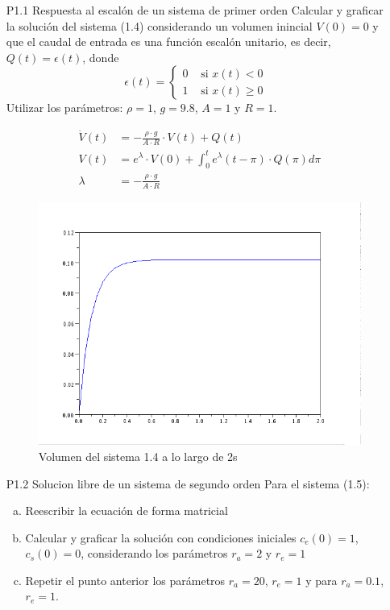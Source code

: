 \documentclass{article}
\begin{document}
\begin{itemize}

  \item[P1.1] Respuesta al escalón de un sistema de primer orden
Calcular y graficar la solución del sistema (1.4) considerando un volumen inincial $ V(0)=0 $ y que el caudal de entrada es una función escalón unitario, es decir, $Q(t)=\epsilon(t)$, donde 
\begin{equation}
\epsilon(t) = \left\{ \begin{array}{rl}
  0 &\mbox{ si $x(t) < 0$} \\
  1 &\mbox{ si $x(t) \geq 0$ }
       \end{array} \right .
 \label{P1.1a} \tag{P1.1a}
\end{equation}
Utilizar los parámetros: $\rho = 1$, $g=9.8$, $A= 1$ y $R = 1$.

\begin{align*}
  \dot{V}(t) &= -\frac{\rho \cdot g}{A \cdot R} \cdot V(t) + Q(t) \\
  V(t) &= e^{\lambda} \cdot V(0) + \int_0^t e^{\lambda} (t - \pi) \cdot Q(\pi) d\pi \\
  \lambda &= -\frac{\rho \cdot g}{A \cdot R}
\end{align*}

\begin{figure}[h]
\includegraphics[width=\textwidth]{img/ej01.png}
\caption{Volumen del sistema 1.4 a lo largo de 2s}
\label{fig:p1.1}
\end{figure}

  \item[P1.2] Solucion libre de un sistema de segundo orden
	Para el sistema (1.5):
	\begin{enumerate}[a)]
	\item Reescribir la ecuación de forma matricial
	\item Calcular y graficar la solución con condiciones iniciales $c_{e}(0)=1$, $c_{s}(0)=0$, considerando los parámetros $r_{a}=2$ y $r_{e}=1$
	\item Repetir el punto anterior los parámetros $r_{a}=20$, $r_{e}=1$ y para $r_{a} = 0.1$, $r_{e}=1$.
	\end{enumerate}


\end{itemize}
\end{document}
